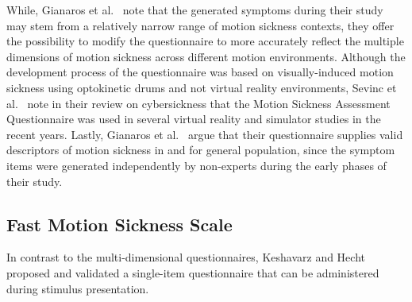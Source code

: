 While, Gianaros et al.~\cite{Gianaros2001} note that the generated symptoms during their study may stem from a
relatively narrow range of motion sickness contexts, they offer the possibility to modify the questionnaire to more
accurately reflect the multiple dimensions of motion sickness across different motion environments.
Although the development process of the questionnaire was based on visually-induced motion sickness using optokinetic
drums and not virtual reality environments, Sevinc et al.~\cite{Sevinc2020} note in their review on cybersickness
that the Motion Sickness Assessment Questionnaire was used in several virtual reality and simulator studies in the
recent years.
Lastly, Gianaros et al.~\cite{Gianaros2001} argue that their questionnaire supplies valid descriptors of motion
sickness in and for general population, since the symptom items were generated independently by non-experts during
the early phases of their study.

\subsection{Fast Motion Sickness Scale}\label{subsec:fast-motion-sickness-scale}

In contrast to the multi-dimensional questionnaires, Keshavarz and Hecht~\cite{Keshavarz2011} proposed and validated
a single-item questionnaire that can be administered during stimulus presentation.
\cite{Keshavarz2011, Sevinc2020, Rebenitsch2016}
